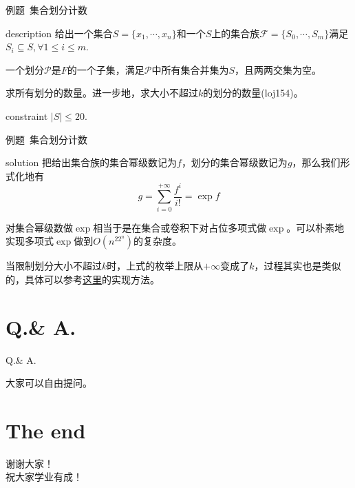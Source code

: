\documentclass{beamer}
\begin{document}
	\begin{frame}{例题\ 集合划分计数}
		\begin{block}{description}
			给出一个集合$S = \{x_1, \cdots, x_n\}$和一个$S$上的集合族$\mathcal F = \{S_0, \cdots, S_m\}$满足$S_i \subseteq S, \forall 1 \le i \le m$.
			
			一个划分$\mathcal P$是$F$的一个子集，满足$\mathcal P$中所有集合并集为$S$，且两两交集为空。
			
			求所有划分的数量。进一步地，求大小不超过$k$的划分的数量(loj154)。
		\end{block}
		\begin{block}{constraint}
			$|S| \le 20.$
		\end{block}
	\end{frame}
	\begin{frame}{例题\ 集合划分计数}
		\begin{block}{solution}
	把给出集合族的集合幂级数记为$f$，划分的集合幂级数记为$g$，那么我们形式化地有$$g = \sum_{i=0}^{+\infty}\frac{f^i}{i!} = \exp f$$
	
	对集合幂级数做$\exp$相当于是在集合或卷积下对占位多项式做$\exp$。可以朴素地实现多项式$\exp$做到$O(n^22^n)$的复杂度。
	
	当限制划分大小不超过$k$时，上式的枚举上限从$+\infty$变成了$k$，过程其实也是类似的，具体可以参考\href{https://www.cnblogs.com/xyz32768/p/12953188.html}{\color{red}这里}的实现方法。
\end{block}
	\end{frame}
	\section{Q.\& A.}
		\begin{frame}{Q.\& A.}
			\begin{center}
				{\large 大家可以自由提问。}
			\end{center}
		\end{frame}
		\section{The end}
		\begin{frame}
			\begin{center}
				{\huge 谢谢大家！\\  \large 祝大家学业有成！}
			\end{center}
	\end{frame}
\end{document}
